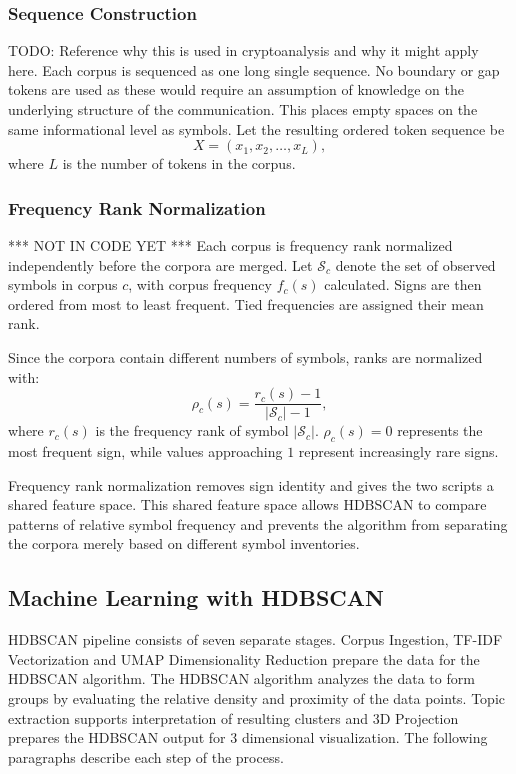 \documentclass[preprint,12pt]{elsarticle}
\begin{document}
\subsubsection{Sequence Construction}
TODO: Reference why this is used in cryptoanalysis and why it might apply here. 
Each corpus is sequenced as one long single sequence. No boundary or gap tokens are used as these would require an assumption of knowledge on the underlying structure of the communication. This places empty spaces on the same informational level as symbols.
Let the resulting ordered token sequence be
\[
X = (x_1,x_2,\ldots,x_L),
\]where \(L\) is the number of tokens in the corpus.

\subsubsection{Frequency Rank Normalization} *** NOT IN CODE YET ***
Each corpus is frequency rank normalized independently before the corpora are merged. Let \(\mathcal{S}_c\) denote the set of observed symbols in corpus \(c\), with corpus frequency \(f_c(s)\) calculated. Signs are then ordered from most to least frequent. Tied frequencies are assigned their mean rank.

Since the corpora contain different numbers of symbols, ranks are normalized with:
\[
\rho_c(s)=\frac{r_c(s)-1}{|\mathcal{S}_c|-1},
\]
where \(r_c(s)\) is the frequency rank of 
symbol \(\left|\mathcal{S}_c\right|\). \(\rho_c(s)=0\) represents the most frequent sign, while values approaching \(1\) represent increasingly rare signs.

Frequency rank normalization removes sign identity and gives the two scripts a shared feature space. This shared feature space allows HDBSCAN to compare patterns of relative symbol frequency and prevents the algorithm from separating the corpora merely based on different symbol inventories. 

\subsection{Machine Learning with HDBSCAN}
HDBSCAN pipeline consists of seven separate stages. Corpus Ingestion, TF-IDF Vectorization and UMAP Dimensionality Reduction prepare the data for the HDBSCAN algorithm. The HDBSCAN algorithm analyzes the data to form groups by evaluating the relative density and proximity of the data points. Topic extraction supports interpretation of resulting clusters and 3D Projection prepares the HDBSCAN output for 3 dimensional visualization. The following paragraphs describe each step of the process.
\end{document}

